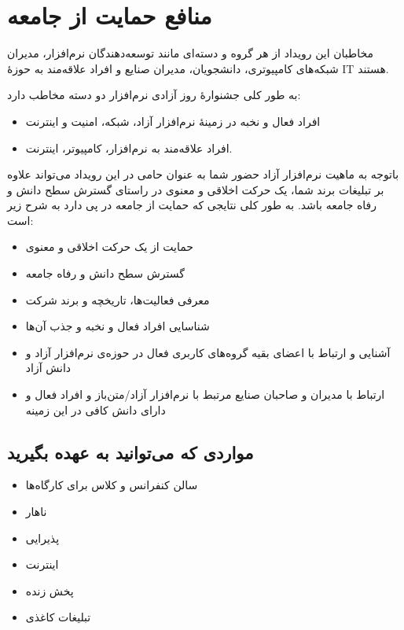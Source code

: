 \documentclass{article}
\begin{document}
\section{منافع حمایت از جامعه}
مخاطبان این رویداد از هر گروه و دسته‌ای مانند توسعه‌دهندگان نرم‌افزار، مدیران شبکه‌های کامپیوتری، دانشجویان، مدیران صنایع و افراد علاقه‌مند به حوزهٔ IT  هستند.

\begin{flushright}

به طور کلی جشنوارهٔ روز‌ آزادی نرم‌افزار دو دسته مخاطب دارد:
\begin{itemize}
\item افراد فعال و نخبه در زمینهٔ نرم‌افزار آزاد، شبکه، امنیت و اینترنت
\item افراد علاقه‌مند به نرم‌افزار، کامپیوتر، اینترنت.
\end{itemize}

\end{flushright}
\begin{flushright}

باتوجه به ماهیت نرم‌افزار آزاد حضور شما به عنوان حامی در این رویداد می‌تواند علاوه‌ بر تبلیغات برند شما، یک حرکت اخلاقی و معنوی در راستای گسترش سطح دانش و رفاه جامعه باشد. به طور کلی نتایجی که حمایت از جامعه در پی دارد به شرح زیر است:
\begin{itemize}
\item حمایت از یک حرکت اخلاقی و معنوی
\item گسترش سطح دانش و رفاه جامعه
\item معرفی فعالیت‌ها، تاریخچه و برند شرکت
\item شناسایی افراد فعال و نخبه و جذب آن‌ها
\item آشنایی و ارتباط با اعضای بقیه گروه‌های کاربری فعال در حوزه‌ی نرم‌افزار آزاد و دانش آزاد
\item ارتباط با مدیران و صاحبان صنایع مرتبط با نرم‌افزار آزاد/متن‌باز و افراد فعال و دارای دانش کافی در این زمینه
\end{itemize}

\end{flushright}

\subsection{مواردی که می‌توانید به عهده بگیرید}


\begin{flushright}

\begin{itemize}
\item سالن کنفرانس و کلاس برای کارگاه‌ها
\item ناهار
\item پذیرایی
\item اینترنت
\item پخش زنده
\item تبلیغات کاغذی
\end{itemize}

\end{flushright}
\end{document}
